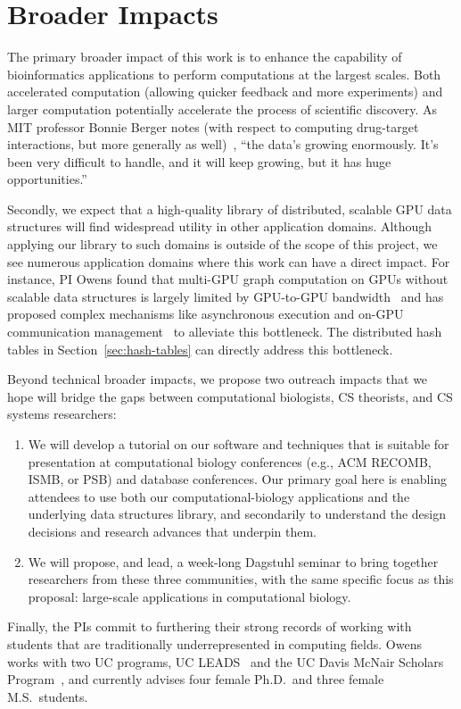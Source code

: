 \section{Broader Impacts}
\label{broadimpacts}

The primary broader impact of this work is to enhance the capability of bioinformatics applications to perform computations at the largest scales. Both accelerated computation (allowing quicker feedback and more experiments) and larger computation potentially accelerate the process of scientific discovery. As MIT professor Bonnie Berger notes (with respect to computing drug-target interactions, but more generally as well)~\cite{Krasilnikova:2022:DDD}, ``the data's growing enormously. It's been very difficult to handle, and it will keep growing, but it has huge opportunities.'' 

Secondly, we expect that a high-quality library of distributed, scalable GPU data structures will find widespread utility in other application domains. Although applying our library to such domains is outside of the scope of this project, we see numerous application domains where this work can have a direct impact. For instance, PI Owens found that multi-GPU graph computation on GPUs without scalable data structures is largely limited by GPU-to-GPU bandwidth~\cite{Pan:2017:MGA} and has proposed complex mechanisms like asynchronous execution and on-GPU communication management~\cite{Chen:2022:SIP} to alleviate this bottleneck. The distributed hash tables in Section~\ref{sec:hash-tables} can directly address this bottleneck.

Beyond technical broader impacts, we propose two outreach impacts that we hope will bridge the gaps between computational biologists, CS theorists, and CS systems researchers:

\begin{enumerate}[noitemsep]
  \item We will develop a tutorial on our software and techniques that is suitable for presentation at computational biology conferences (e.g., ACM RECOMB, ISMB, or PSB) and database conferences. Our primary goal here is enabling attendees to use both our computational-biology applications and the underlying data structures library, and secondarily to understand the design decisions and research advances that underpin them.
  \item We will propose, and lead, a week-long Dagstuhl seminar to bring together researchers from these three communities, with the same specific focus as this proposal: large-scale applications in computational biology.
\end{enumerate}

Finally, the PIs commit to furthering their strong records of working with students that are traditionally underrepresented in computing fields. Owens works with two UC programs, UC LEADS~\cite{UCLeads:2003:WEB} and the UC Davis McNair Scholars Program~\cite{McNair:2003:WEB}, and currently advises four female Ph.D.\ and three female M.S.\ students.

